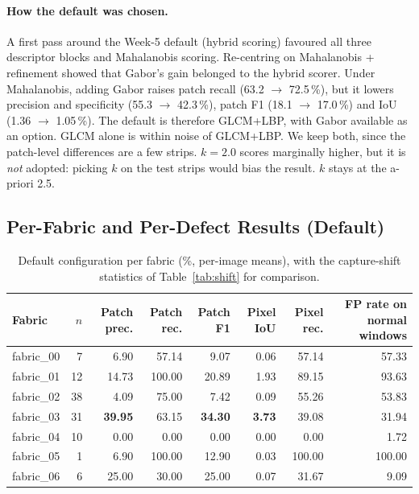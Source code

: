 \documentclass[11pt,a4paper]{article}
\begin{document}
\paragraph{How the default was chosen.} A first pass around the Week-5 default (hybrid scoring) favoured all three descriptor blocks and Mahalanobis scoring. Re-centring on Mahalanobis + refinement showed that Gabor's gain belonged to the hybrid scorer. Under Mahalanobis, adding Gabor raises patch recall (63.2 $\rightarrow$ 72.5\,\%), but it lowers precision and specificity (55.3 $\rightarrow$ 42.3\,\%), patch F1 (18.1 $\rightarrow$ 17.0\,\%) and IoU (1.36 $\rightarrow$ 1.05\,\%). The default is therefore GLCM+LBP, with Gabor available as an option. GLCM alone is within noise of GLCM+LBP. We keep both, since the patch-level differences are a few strips. $k=2.0$ scores marginally higher, but it is \emph{not} adopted: picking $k$ on the test strips would bias the result. $k$ stays at the a-priori 2.5.

\subsection*{Per-Fabric and Per-Defect Results (Default)}

\begin{table}[h]
\centering
\caption{Default configuration per fabric (\%, per-image means), with the capture-shift statistics of Table~\ref{tab:shift} for comparison.}
\label{tab:fabric}
\small
\begin{tabularx}{\textwidth}{@{}lrRRRRRR@{}}
\toprule
\textbf{Fabric} & $n$ & \textbf{Patch prec.} & \textbf{Patch rec.} & \textbf{Patch F1} & \textbf{Pixel IoU} & \textbf{Pixel rec.} & \textbf{FP rate on normal windows} \\
\midrule
fabric\_00 & 7 & 6.90 & 57.14 & 9.07 & 0.06 & 57.14 & 57.33 \\
fabric\_01 & 12 & 14.73 & 100.00 & 20.89 & 1.93 & 89.15 & 93.63 \\
fabric\_02 & 38 & 4.09 & 75.00 & 7.42 & 0.09 & 55.26 & 53.83 \\
fabric\_03 & 31 & \textbf{39.95} & 63.15 & \textbf{34.30} & \textbf{3.73} & 39.08 & 31.94 \\
fabric\_04 & 10 & 0.00 & 0.00 & 0.00 & 0.00 & 0.00 & 1.72 \\
fabric\_05 & 1 & 6.90 & 100.00 & 12.90 & 0.03 & 100.00 & 100.00 \\
fabric\_06 & 6 & 25.00 & 30.00 & 25.00 & 0.07 & 31.67 & 9.09 \\
\bottomrule
\end{tabularx}
\end{table}
\end{document}
